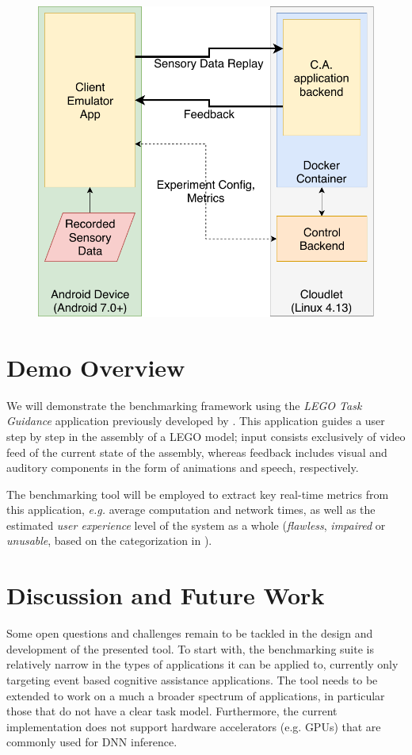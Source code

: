\begin{figure}
  \centering
  \includegraphics[width=.7\columnwidth]{publications/2018DemoScalingOnTheEdge/img/TraceReplay_GenArch}
  \label{fig:TraceReplayArch}
\end{figure}

\section{Demo Overview}

We will demonstrate the benchmarking framework using the \emph{LEGO Task Guidance} application previously developed by \textcite{Chen2015Early}.
This application guides a user step by step in the assembly of a LEGO model; input consists exclusively of video feed of the current state of the assembly, whereas feedback includes visual and auditory components in the form of animations and speech, respectively.

The benchmarking tool will be employed to extract key real-time metrics from this application, \emph{e.g.} average computation and network times, as well as the estimated \emph{user experience} level of the system as a whole (\emph{flawless}, \emph{impaired} or \emph{unusable}, based on the categorization in \cite{Chen2017Empirical}).

\section{Discussion and Future Work}

Some open questions and challenges remain to be tackled in the design and development of the presented tool.
To start with, the benchmarking suite is relatively narrow in the types of applications it can be applied to, currently only targeting event based cognitive assistance applications.
The tool needs to be extended to work on a much a broader spectrum of applications, in particular those that do not have a clear task model.
Furthermore, the current implementation does not support hardware accelerators (e.g. \acsp*{GPU}) that are commonly used for \ac{DNN} inference.

